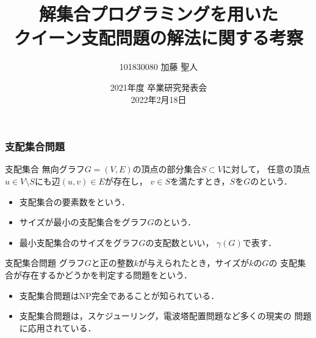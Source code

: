 \documentclass[dvipdfmx,10pt]{beamer}
\begin{document}
\title{解集合プログラミングを用いた\\クイーン支配問題の解法に関する考察}
\author{101830080 \quad 加藤 聖人}
\date{2021年度 卒業研究発表会 \\ 2022年2月18日}

%
%

\begin{frame}\frametitle{}
 \titlepage
\end{frame}

%
%

\begin{frame}\frametitle{支配集合問題}
 \begin{block}{支配集合}
  無向グラフ$G=(V,E)$の頂点の部分集合$S\subset V$に対して，
任意の頂点$u \in V\setminus S$にも辺$(u,v) \in E$が存在し，
$v \in S$を満たすとき，$S$を$G$のという．
  \begin{itemize}
   \item 支配集合の要素数をという．
   \item サイズが最小の支配集合をグラフ$G$のという．
   \item 最小支配集合のサイズをグラフ$G$の\alert{支配数}といい，
$\gamma(G)$で表す．
  \end{itemize}
 \end{block}
 \begin{block}{支配集合問題}
  グラフ$G$と正の整数$k$が与えられたとき，サイズが$k$の$G$の
支配集合が存在するかどうかを判定する問題をという．
  \begin{itemize}
   \item 支配集合問題はNP完全であることが知られている．
   \item 支配集合問題は，スケジューリング，電波塔配置問題など多くの現実の
	 問題に応用されている．
  \end{itemize}
 \end{block}
\end{frame}

%
%
\end{document}
